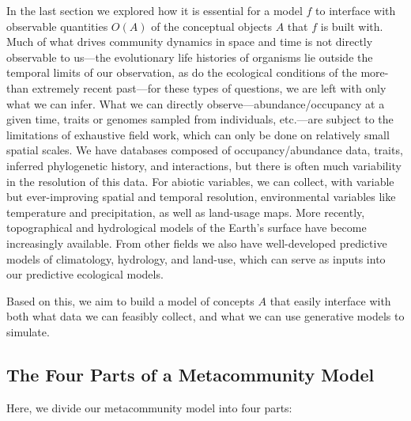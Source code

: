 \documentclass[]{article}
\begin{document}
In the last section we explored how it is essential for a model \(f\) to
interface with observable quantities \(O(A)\) of the conceptual objects
\(A\) that \(f\) is built with. Much of what drives community dynamics
in space and time is not directly observable to us---the evolutionary
life histories of organisms lie outside the temporal limits of our
observation, as do the ecological conditions of the more-than extremely
recent past---for these types of questions, we are left with only what we can infer. What we can directly
observe---abundance/occupancy at a given time, traits or genomes sampled
from individuals, etc.---are subject to the limitations of exhaustive
field work, which can only be done on relatively small spatial scales.
We have databases composed of occupancy/abundance data, traits, inferred
phylogenetic history, and interactions, but
there is often much variability in the resolution of this data. For
abiotic variables, we can collect, with variable but ever-improving
spatial and temporal resolution, environmental variables like
temperature and precipitation, as well as land-usage maps. More
recently, topographical and hydrological models of the Earth's surface have become increasingly available.
From other fields we also have well-developed predictive models of
climatology, hydrology, and land-use, which can serve as inputs into our
predictive ecological models.

Based on this, we aim to build a model of concepts $A$ that easily interface with both what data we can feasibly collect, and what we can use generative models to simulate.


\hypertarget{the-four-parts-of-a-metacommunity-model}{%
\subsection{The Four Parts of a Metacommunity
Model}\label{the-four-parts-of-a-metacommunity-model}}

Here, we divide our metacommunity model into four parts:
\end{document}
